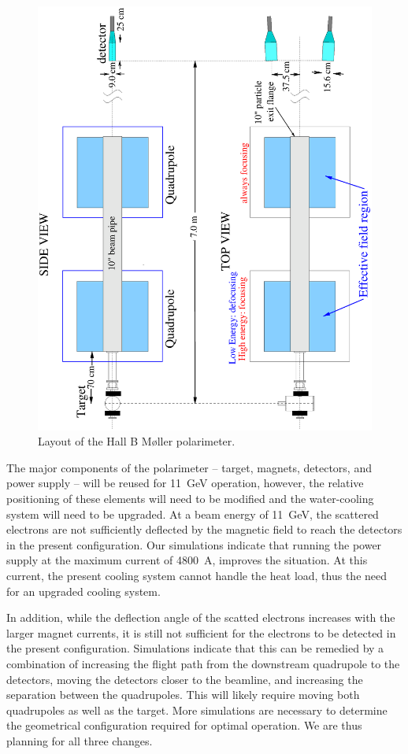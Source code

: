 \begin{figure}[ht]
\centering
\includegraphics[width=12cm,angle=270]{layout.ps}
\caption{\small{Layout of the Hall B M{\o}ller polarimeter.}}
\label{fig-layout}
\end{figure}

The major components of the polarimeter -- target, magnets, detectors, and
power supply -- will be reused for 11~GeV operation, however, the relative
positioning of these elements will need to be modified and the
water-cooling system will need to be upgraded.  At a beam energy of 11~GeV,
the scattered electrons are not sufficiently deflected by the magnetic
field to reach the detectors in the present configuration.  Our simulations
indicate that running the power supply at the maximum current of 4800~A,
improves the situation.  At this current, the present cooling system cannot
handle the heat load, thus the need for an upgraded cooling system.

In addition, while the deflection angle of the scatted electrons increases
with the larger magnet currents, it is still not sufficient for the
electrons to be detected in the present configuration.  Simulations
indicate that this can be remedied by a combination of increasing the
flight path from the downstream quadrupole to the detectors, moving the
detectors closer to the beamline, and increasing the separation between the
quadrupoles. This will likely require moving both quadrupoles as well as
the target. More simulations are necessary to determine the geometrical 
configuration required for optimal operation.  We are thus planning for 
all three changes.

